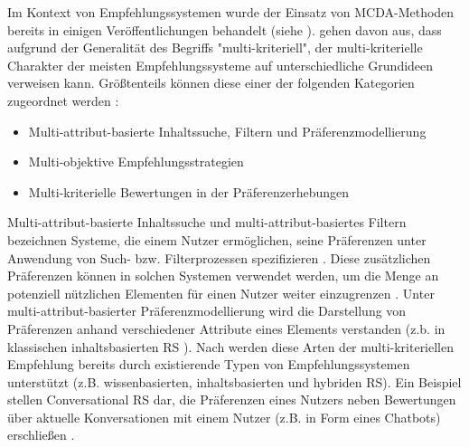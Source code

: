 Im Kontext von Empfehlungssystemen wurde der Einsatz von \ac{MCDA}-Metho\-den bereits in einigen Veröffentlichungen behandelt (siehe \cite{adomavicius:inproceedings:2}\cite{adomavicius:4:inbook}\cite{hdioud:inproceedings}\cite{lakiotaki:article}\cite{manouselis:article}\cite{zheng:inproceedings}).
\textcite[S. 849]{adomavicius:4:inbook} gehen davon aus, dass aufgrund der Generalität des Begriffs "multi-kriteriell", der multi-kriterielle Charakter \cite[S. 10]{adomavicius:5:inbook} der meisten Empfehlungssysteme auf unterschiedliche Grundideen verweisen kann.
Größtenteils können diese einer der folgenden Kategorien zugeordnet werden \cite[S. 849]{adomavicius:4:inbook}\cite[S. 10]{adomavicius:5:inbook}:
\begin{itemize}
    \item Multi-attribut-basierte Inhaltssuche, Filtern und Präferenzmodellierung
    \item Multi-objektive Empfehlungsstrategien
    \item Multi-kriterielle Bewertungen in der Präferenzerhebungen
\end{itemize}

Multi-attribut-basierte Inhaltssuche und multi-attribut-basiertes Filtern bezeichnen Systeme, die einem Nutzer ermöglichen, seine Präferenzen unter Anwendung von Such- bzw. Filterprozessen spezifizieren \cite[S. 851]{adomavicius:4:inbook}\cite[S. 10]{adomavicius:5:inbook}.
Diese zusätzlichen Präferenzen können in solchen Systemen verwendet werden, um die Menge an potenziell nützlichen Elementen für einen Nutzer weiter einzugrenzen \cite[S. 11]{adomavicius:5:inbook}.
Unter multi-attribut-basierter Präferenzmodellierung wird die Darstellung von Präferenzen anhand verschiedener Attribute eines Elements verstanden (z.b. in klassischen inhaltsbasierten \ac{RS} \cite[S. 10]{adomavicius:5:inbook}\cite[S. 205]{hdioud:inproceedings}).
Nach \textcite[S. 850]{adomavicius:4:inbook} werden diese Arten der multi-kriteriellen Empfehlung bereits durch existierende Typen von Empfehlungssystemen unterstützt (z.B. wissenbasierten, inhaltsbasierten und hybriden \ac{RS}).
Ein Beispiel stellen Conversational \ac{RS} dar, die Präferenzen eines Nutzers neben Bewertungen über aktuelle Konversationen mit einem Nutzer (z.B. in Form eines Chatbots) erschließen \cite[S. 1]{yueming:article}.

